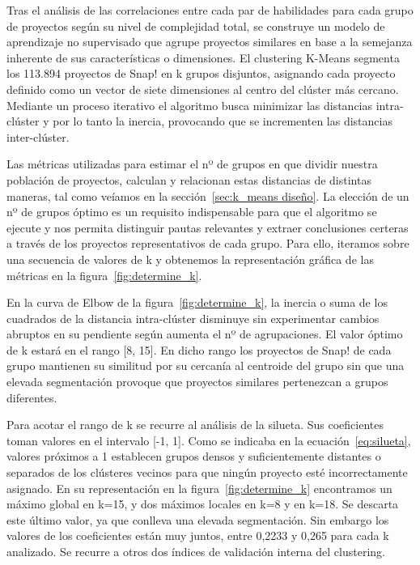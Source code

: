 \documentclass[a4paper, 12pt]{book}
\begin{document}
Tras el análisis de las correlaciones entre cada par de habilidades para cada grupo de proyectos según su nivel de complejidad total, se construye un modelo de aprendizaje no supervisado que agrupe proyectos similares en base a la semejanza inherente de sus características o dimensiones. El clustering K-Means segmenta los 113.894 proyectos de Snap! en k grupos disjuntos, asignando cada proyecto definido como un vector de siete dimensiones al centro del clúster más cercano. Mediante un proceso iterativo el algoritmo busca minimizar las distancias intra-clúster y por lo tanto la inercia, provocando que se incrementen las distancias inter-clúster. 

Las métricas utilizadas para estimar el nº de grupos en que dividir nuestra población de proyectos, calculan y relacionan estas distancias de distintas maneras, tal como veíamos en la sección~\ref{sec:k_means diseño}. La elección de un nº de grupos óptimo es un requisito indispensable para que el algoritmo se ejecute y nos permita distinguir pautas relevantes y extraer conclusiones certeras a través de los proyectos representativos de cada grupo. Para ello, iteramos sobre una secuencia de valores de k y obtenemos la representación gráfica de las métricas en la figura~\ref{fig:determine_k}.

En la curva de Elbow de la figura~\ref{fig:determine_k}, la inercia o suma de los cuadrados de la distancia intra-clúster disminuye sin experimentar cambios abruptos en su pendiente según aumenta el nº de agrupaciones. El valor óptimo de k estará en el rango [8, 15]. En dicho rango los proyectos de Snap! de cada grupo mantienen su similitud por su cercanía al centroide del grupo sin que una elevada segmentación provoque que proyectos similares pertenezcan a grupos diferentes. 

Para acotar el rango de k se recurre al análisis de la silueta. Sus coeficientes toman valores en el intervalo [-1, 1]. Como se indicaba en la ecuación~\eqref{eq:silueta}, valores próximos a 1 establecen grupos densos y suficientemente distantes o separados de los clústeres vecinos para que ningún proyecto esté incorrectamente asignado. En su representación en la figura~\ref{fig:determine_k} encontramos un máximo global en k=15, y dos máximos locales en k=8 y en k=18. Se descarta este último valor, ya que conlleva una elevada segmentación. Sin embargo los valores de los coeficientes están muy juntos, entre 0,2233 y 0,265 para cada k analizado. Se recurre a otros dos índices de validación interna del clustering. 
\end{document}
